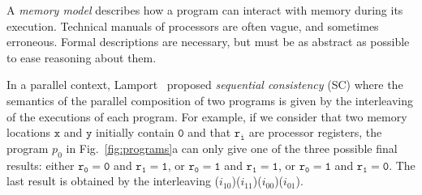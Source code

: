A \emph{memory model} describes how a program can interact with memory during
its execution. Technical manuals of processors are often vague, and
sometimes erroneous. Formal descriptions are necessary, but must be as
abstract as possible to ease reasoning about them. 

In a parallel context, Lamport~\cite{L79:IEEE} proposed \emph{sequential consistency} (SC)
where the semantics of the parallel composition of two programs is given
by the interleaving of the executions of each program. 
For example, if we consider that two memory locations 
$\mathtt{x}$ and $\mathtt{y}$ initially contain  
$\mathtt{0}$ and that $\mathtt{r_i}$ are processor registers,
the program $p_0$ in Fig.~\ref{fig:programs}a can only give one of
the three possible final results: either
$\mathtt{r_0 = 0}$ and $\mathtt{r_1 = 1}$, or
$\mathtt{r_0 = 1}$ and $\mathtt{r_1 = 1}$, or
$\mathtt{r_0 = 1}$ and $\mathtt{r_1 = 0}$.
The last result is obtained by the interleaving ($i_{10}$)($i_{11}$)($i_{00}$)($i_{01}$).


